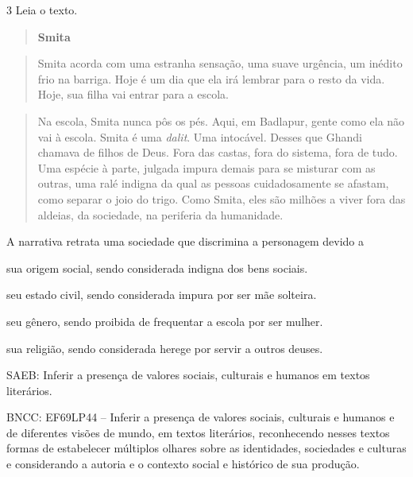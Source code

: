 \num{3} Leia o texto.

\begin{quote}
\textbf{Smita}
\end{quote}

\begin{quote}
Smita acorda com uma estranha sensação, uma suave urgência, um inédito
frio na barriga. Hoje é um dia que ela irá lembrar para o resto da vida.
Hoje, sua filha vai entrar para a escola.
\end{quote}

\begin{quote}
Na escola, Smita nunca pôs os pés. Aqui, em Badlapur, gente como ela não
vai à escola. Smita é uma \emph{dalit}. Uma intocável. Desses que Ghandi
chamava de filhos de Deus. Fora das castas, fora do sistema, fora de
tudo. Uma espécie à parte, julgada impura demais para se misturar com as
outras, uma ralé indigna da qual as pessoas cuidadosamente se afastam,
como separar o joio do trigo. Como Smita, eles são milhões a viver fora
das aldeias, da sociedade, na periferia da humanidade.
\end{quote}


A narrativa retrata uma sociedade que discrimina a personagem devido a

\begin{escolha}
\item sua origem social, sendo considerada indigna dos bens sociais.

\item seu estado civil, sendo considerada impura por ser mãe solteira.

\item seu gênero, sendo proibida de frequentar a escola por ser mulher.

\item sua religião, sendo considerada herege por servir a outros deuses.
\end{escolha}

SAEB: Inferir a presença de valores sociais, culturais e humanos em
textos literários. 

BNCC: EF69LP44 -- Inferir a presença de valores
sociais, culturais e humanos e de diferentes visões de mundo, em textos
literários, reconhecendo nesses textos formas de estabelecer múltiplos
olhares sobre as identidades, sociedades e culturas e considerando a
autoria e o contexto social e histórico de sua produção.

